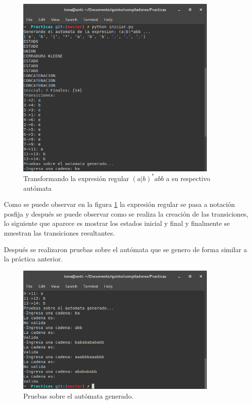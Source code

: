 \documentclass[titlepage]{article}
\begin{document}
  \begin{figure}[H]
    \begin{center}
      \includegraphics[width=10cm]{generacion.png}
	\caption{Transformando la expresión regular $ (a|b)^{*}abb $ a su respectivo autómata}
	\label{fig:generacion}
    \end{center}
  \end{figure}
  
  Como se puede observar en la figura \ref{fig:generacion} la expresión regular se pasa a notación posfija y después se puede observar como se realiza 
  la creación de las transiciones, lo siguiente que aparece es mostrar los estados inicial y final y finalmente se muestran las transiciones resultantes. 
  
  Después se realizaron pruebas sobre el autómata que se genero de forma similar a la práctica anterior.
  
  \begin{figure}[H]
    \begin{center}
      \includegraphics[width=10cm]{pruebas.png}
	\caption{Pruebas sobre el autómata generado.}
	\label{fig:pruebas}
    \end{center}
  \end{figure}
  
\end{document}
